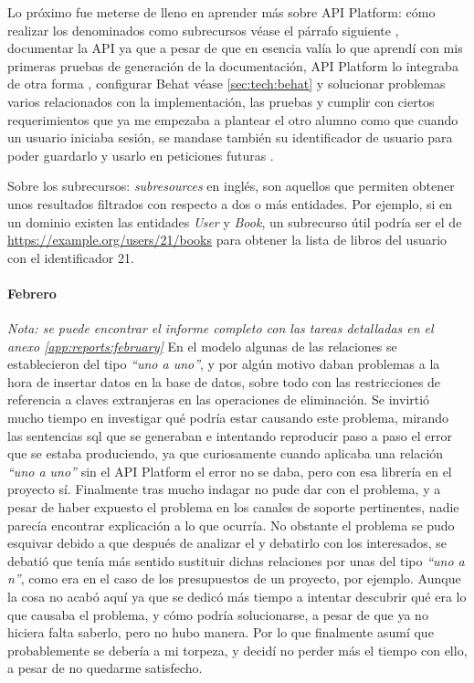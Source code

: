 Lo próximo fue meterse de lleno en aprender más sobre API Platform: cómo realizar
los denominados como subrecursos \textemdash véase el párrafo siguiente \textemdash, documentar la API \textemdash ya que a pesar de
que en esencia valía lo que aprendí con mis primeras pruebas de generación de
la documentación, API Platform lo integraba de otra forma \textemdash, configurar
Behat \textemdash véase \ref{sec:tech:behat} \textemdash y solucionar problemas
varios relacionados con la implementación, las pruebas y cumplir con ciertos
requerimientos que ya me empezaba a plantear el otro alumno \textemdash como que
cuando un usuario iniciaba sesión, se mandase también su identificador de usuario
para poder guardarlo y usarlo en peticiones futuras \textemdash.

Sobre los subrecursos: \textit{subresources} en inglés, son aquellos que permiten
obtener unos resultados filtrados con respecto a dos o más entidades. Por ejemplo, si
en un dominio existen las entidades \textit{User} y \textit{Book}, un
subrecurso útil podría ser el de \url{https://example.org/users/21/books} para
obtener la lista de libros del usuario con el identificador 21.

\paragraph{Febrero}
\textit{Nota: se puede encontrar el informe completo con las tareas detalladas
en el anexo \ref{app:reports:february}}
En el modelo algunas de las relaciones se establecieron del tipo \textit{``uno a uno''},
y por algún motivo daban problemas a la hora de insertar datos en la base de datos,
sobre todo con las restricciones de referencia a claves extranjeras en las
operaciones de eliminación. Se invirtió mucho tiempo en investigar qué podría estar
causando este problema, mirando las sentencias \gls{sql} que se generaban e intentando
reproducir paso a paso el error que se estaba produciendo, ya que curiosamente cuando
aplicaba una relación \textit{``uno a uno''} sin el 
API Platform el error no se daba, pero con esa librería en el proyecto sí. Finalmente
tras mucho indagar no pude dar con el problema, y a pesar de haber expuesto
el problema en los canales de soporte pertinentes, nadie parecía encontrar explicación
a lo que ocurría. No obstante el problema se pudo esquivar debido a que después
de analizar el  y debatirlo con los
interesados, se debatió que tenía más sentido sustituir dichas relaciones por unas
del tipo \textit{``uno a n''}, como era en el caso de los presupuestos de un
proyecto, por ejemplo. Aunque la cosa no acabó aquí ya que se dedicó más tiempo a
intentar descubrir qué era lo que causaba el problema, y cómo podría solucionarse,
a pesar de que ya no hiciera falta saberlo, pero no hubo manera. Por lo que finalmente
asumí que probablemente se debería a mi torpeza, y decidí no perder más el tiempo con
ello, a pesar de no quedarme satisfecho.

